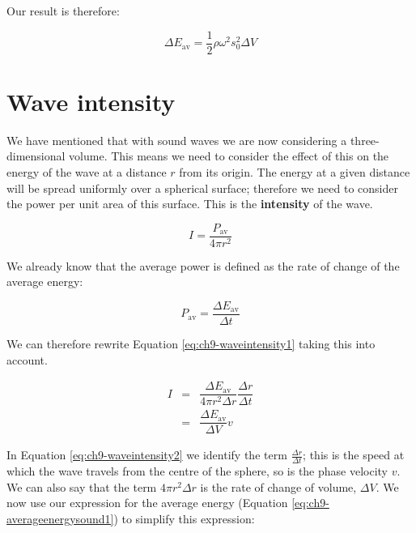 \documentclass[
]{book}
\begin{document}
Our result is therefore:

\begin{equation}
\Delta E_{\mathrm{av}} = \frac{1}{2}\rho \omega^2 s_0^2 \Delta V
\label{eq:ch9-averageenergysound1}
\end{equation}

\hypertarget{sec-ch9-waveintensity}{%
\section{Wave intensity}\label{sec-ch9-waveintensity}}

We have mentioned that with sound waves we are now considering a three-dimensional volume. This means we need to consider the effect of this on the energy of the wave at a distance \(r\) from its origin. The energy at a given distance will be spread uniformly over a spherical surface; therefore we need to consider the power per unit area of this surface. This is the \textbf{intensity} of the wave.

\begin{equation}
I = \frac{P_\text{av}}{4\pi r^2}
\label{eq:ch9-waveintensity1}
\end{equation}

We already know that the average power is defined as the rate of change of the average energy:

\begin{equation}
P_\text{av} = \frac{\Delta E_\text{av}}{\Delta t}
\end{equation}

We can therefore rewrite Equation \eqref{eq:ch9-waveintensity1} taking this into account.

\begin{equation}
\begin{array}{rcl}
I & = &  \dfrac{\Delta E_\text{av}}{4\pi r^2 \Delta r} \dfrac{\Delta r}{\Delta t} \\
 &=& \dfrac{\Delta E_\text{av}}{\Delta V} v
\end{array}
\label{eq:ch9-waveintensity2}
\end{equation}

In Equation \eqref{eq:ch9-waveintensity2} we identify the term \(\frac{\Delta r}{\Delta t}\); this is the speed at which the wave travels from the centre of the sphere, so is the phase velocity \(v\). We can also say that the term \(4 \pi r^2 \Delta r\) is the rate of change of volume, \(\Delta V\). We now use our expression for the average energy (Equation \eqref{eq:ch9-averageenergysound1}) to simplify this expression:
\end{document}
